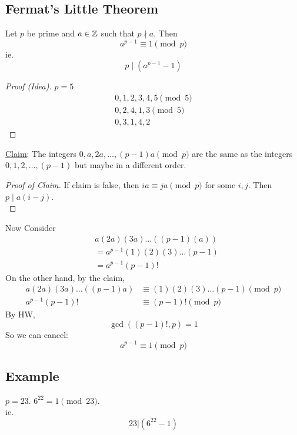     \subsection{Fermat's Little Theorem}
        \begin{theorem}
            Let $p$ be prime and $a\in\mathbb{Z}$ such that $p\nmid a$. Then
            \[
                a^{p-1}\equiv 1\pmod{p}
            \]
            ie.
            \[ 
                p\mid (a^{p-1}-1)
            \]
        \end{theorem}

        \begin{proof} [Proof (Idea)]
            $p=5$ 
            \begin{align*}
                0,1,2,3,4,5 \pmod{5} \\
                0,2,4,1,3 \pmod{5} \\
                0,3,1,4,2
            \end{align*}
        \end{proof}

        \underline{Claim}: The integers $0,a,2a,\dots, (p-1)a \pmod{p}$
        are the same as the integers $0,1,2,\dots,(p-1)$ but maybe
        in a different order.

        \begin{proof} [Proof of Claim]
            If claim is false, then $ia\equiv ja\pmod{p}$ for some $i,j$. 
            Then $p\mid a(i-j)$. \\
        \end{proof}

        Now Consider
        \begin{align*}
            & a(2a)(3a)\dots((p-1)(a)) \\
            &= a^{p-1}(1)(2)(3)\dots(p-1) \\
            &= a^{p-1}(p-1)!
        \end{align*}
        On the other hand, by the claim, 
        \begin{align*}
            a(2a)(3a)\dots((p-1)a) &\equiv (1)(2)(3)\dots(p-1) \pmod{p} \\
            a^{p-1}(p-1)! &\equiv (p-1)! \pmod{p}
        \end{align*}
        By HW, 
        \[ \gcd((p-1)!, p) = 1 \]
        So we can cancel: 
        \[ a^{p-1}\equiv 1\pmod{p} \]
        
    \subsection{Example}
            $p=23$. $6^{22}=1\pmod{23}$.  \\
            ie. \[ 23|(6^{22}-1) \]
        
